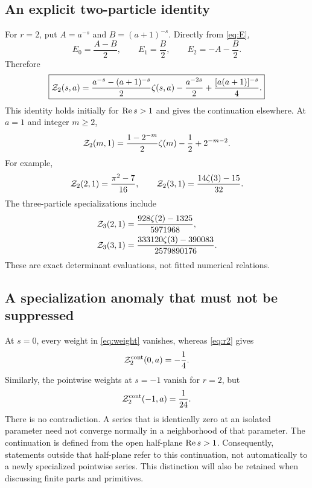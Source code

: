 \subsection{An explicit two-particle identity}
For $r=2$, put $A=a^{-s}$ and $B=(a+1)^{-s}$. Directly from
\eqref{eq:E},
\[
 E_0=\frac{A-B}{2},\qquad E_1=\frac B2,\qquad
 E_2=-A-\frac B2.
\]
Therefore
\begin{equation}\label{eq:r2}
 \boxed{\displaystyle
 \mathcal Z_2(s,a)=\frac{a^{-s}-(a+1)^{-s}}2\zeta(s,a)
       -\frac{a^{-2s}}2+\frac{[a(a+1)]^{-s}}4.}
\end{equation}
This identity holds initially for $\operatorname{Re} s>1$ and gives the continuation
elsewhere. At $a=1$ and integer $m\ge2$,
\begin{equation}\label{eq:r2-integer}
 \mathcal Z_2(m,1)=\frac{1-2^{-m}}2\zeta(m)-\frac12+2^{-m-2}.
\end{equation}
For example,
\[
 \mathcal Z_2(2,1)=\frac{\pi^2-7}{16},\qquad
 \mathcal Z_2(3,1)=\frac{14\zeta(3)-15}{32}.
\]
The three-particle specializations include
\begin{align}
 \mathcal Z_3(2,1)&=\frac{928\zeta(2)-1325}{5971968},\label{eq:r3m2}\\
 \mathcal Z_3(3,1)&=\frac{333120\zeta(3)-390083}{2579890176}.
 \label{eq:r3m3}
\end{align}
These are exact determinant evaluations, not fitted numerical relations.

\subsection{A specialization anomaly that must not be suppressed}
\label{sec:anomaly}
At $s=0$, every weight in \eqref{eq:weight} vanishes, whereas
\eqref{eq:r2} gives
\begin{equation}\label{eq:anomaly}
 \mathcal Z_2^{\mathrm{cont}}(0,a)=-\frac14.
\end{equation}
Similarly, the pointwise weights at $s=-1$ vanish for $r=2$, but
\[
 \mathcal Z_2^{\mathrm{cont}}(-1,a)=\frac1{24}.
\]
There is no contradiction. A series that is identically zero at an isolated
parameter need not converge normally in a neighborhood of that parameter.
The continuation is defined from the open half-plane $\operatorname{Re} s>1$.
Consequently, statements outside that half-plane refer to this continuation,
not automatically to a newly specialized pointwise series. This distinction
will also be retained when discussing finite parts and primitives.
